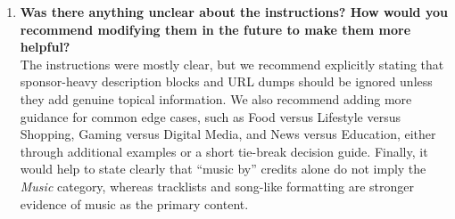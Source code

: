 \documentclass[11pt]{article}
\begin{document}
\begin{enumerate}
  \item \textbf{Was there anything unclear about the instructions? How would you recommend modifying them in the future to make them more helpful?}\\
  The instructions were mostly clear, but we recommend explicitly stating that sponsor-heavy description blocks and URL dumps should be ignored unless they add genuine topical information. We also recommend adding more guidance for common edge cases, such as Food versus Lifestyle versus Shopping, Gaming versus Digital Media, and News versus Education, either through additional examples or a short tie-break decision guide. Finally, it would help to state clearly that ``music by'' credits alone do not imply the \emph{Music} category, whereas tracklists and song-like formatting are stronger evidence of music as the primary content.
\end{enumerate}
\end{document}
